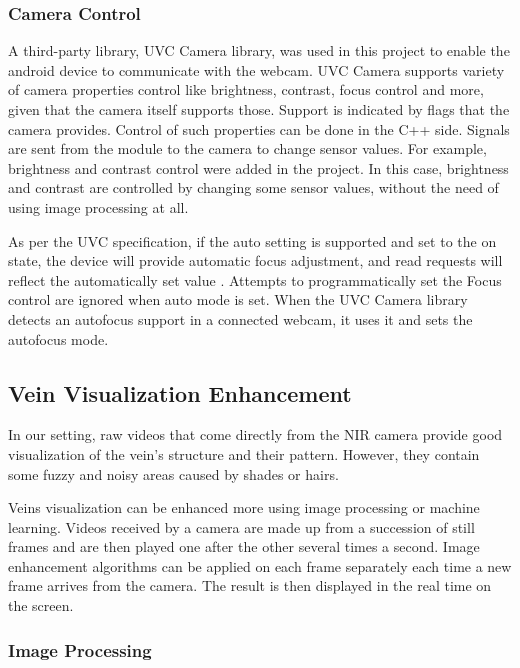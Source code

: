 \subsubsection{Camera Control}

A third-party library, UVC Camera library, was used in this project to enable the android device to communicate with the webcam. UVC Camera supports variety of camera properties control like brightness, contrast, focus control and more, given that the camera itself supports those. Support is indicated by flags that the camera provides. Control of such properties can be done in the C++ side. Signals are sent from the module to the camera to change sensor values. For example, brightness and contrast control were added in the project. In this case, brightness and contrast are controlled by changing some sensor values, without the need of using image processing at all.


As per the UVC specification, if the auto setting is supported and set to the on state, the device will provide automatic focus adjustment, and read requests will reflect the automatically set value \parencite{uvcCamera}. Attempts to programmatically set the Focus control are ignored when auto mode is set. When the UVC Camera library detects an autofocus support in a connected webcam, it uses it and sets the autofocus mode.



\subsection{Vein Visualization Enhancement}

In our setting, raw videos that come directly from the NIR camera provide good visualization of the vein’s structure and their pattern. However, they contain some fuzzy and noisy areas caused by shades or hairs.

Veins visualization can be enhanced more using image processing or machine learning.
Videos received by a camera are made up from a succession of still frames and are then played one after the other several times a second. Image enhancement algorithms can be applied on each frame separately each time a new frame arrives from the camera. The result is then displayed in the real time on the screen.


\subsubsection{Image Processing}

